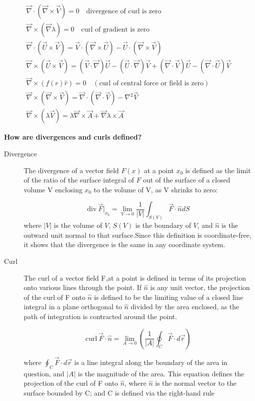 \documentclass[a4paper]{article}
\numberwithin{equation}{subsection}  %
\begin{document}
\begin{gather*}
\vec{\nabla}\cdot (\vec{\nabla}\times \vec{V}) = 0 \quad \text{divergence of curl is zero} \\
\vec{\nabla}\times (\vec{\nabla} \lambda) = 0 \quad \text{curl of gradient is zero }\\
\vec{\nabla}\cdot (\vec{U}\times \vec{V}) = \vec{V}\cdot(\vec{\nabla} \times \vec{U}) - \vec{U}\cdot(\vec{\nabla} \times \vec{V})\\
\vec{\nabla}\times (\vec{U}\times \vec{V}) = (\vec{V}\cdot\vec{\nabla}) \vec{U} - (\vec{U}\cdot\vec{\nabla})  \vec{V} + (\vec{\nabla}\cdot \vec{V}) \vec{U} - (\vec{\nabla}\cdot \vec{U}) \vec{V} \\
\vec{\nabla} \times (f(r)\hat{r}) = 0 \quad (\text{curl of central force or field is zero})\\
\vec{\nabla} \times (\vec{\nabla}\times \vec{V})  = \vec{\nabla} \cdot (\vec{\nabla} \cdot \vec{V}) - \nabla^2 \vec{V}\\
\vec{\nabla} \times (\lambda \vec{V}) = \lambda \vec{\nabla} \times \vec{A} +  \vec{\nabla}\lambda \times \vec{A}
\end{gather*}

\textbf{How are divergences and curls defined?}
\begin{description}
	\item[Divergence] The divergence of a vector field $F(x)$ at a point $x_0$ is defined as the limit of the ratio of the surface integral of $F$ out of the surface of a closed volume V enclosing $x_0$ to the volume of V, as V shrinks to zero:
	
	
	$$ \mathrm{div}\ \vec{F} |_{x_0} = \lim\limits_{V \to 0} \frac{1}{|V|} \int_{S(V)} \vec{F} \cdot\hat{n} dS$$
where $|V|$ is the volume of $V$, $S(V)$ is the boundary of $V$, and $\hat{n}$ is the outward unit normal to that surface.Since this definition is coordinate-free, it shows that the divergence is the same in any coordinate system.

\item[Curl]
The curl of a vector field F,at a point is defined in terms of its projection onto various lines through the point. If $\hat{n}$ is any unit vector, the projection of the curl of F onto $\hat{n}$ is defined to be the limiting value of a closed line integral in a plane orthogonal to $\hat{n}$ divided by the area enclosed, as the path of integration is contracted around the point.

$$ \text{curl}\ \vec{F} \cdot\hat{n} = \lim\limits_{A \to 0} \left(\frac{1}{|A|} \oint_C \vec{F} \cdot d\vec{r}\right)$$

where $\oint_C \vec{F} \cdot d\vec{r}$ is a line integral along the boundary of the area in question, and $|A|$ is the magnitude of the area. This equation defines the projection of the curl of F onto $\hat{n}$, where $\hat{n}$ is the normal vector to the surface bounded by C; and C is defined via the right-hand rule
\end{description}
\end{document}
